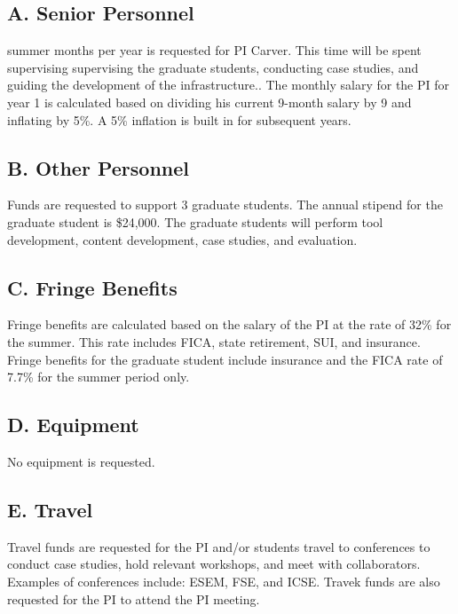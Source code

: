 \subsection*{A. Senior Personnel}
 summer months per year is requested for PI Carver. 
This time will be spent supervising supervising the graduate students, conducting case studies, and guiding the development of the infrastructure..
The monthly salary for the PI for year 1 is calculated based on dividing his current 9-month salary by 9 and inflating by 5\%. 
A 5\% inflation is built in for subsequent years. 
\vspace{8pt}

\subsection*{B. Other Personnel}
\noindent
Funds are requested to support 3 graduate students. 
The annual stipend for the graduate student is \$24,000.
The graduate students will perform tool development, content development, case studies, and evaluation. 
\vspace{8pt}

\subsection*{C. Fringe Benefits}
\noindent
Fringe benefits are calculated based on the salary of the PI at the rate of 32\% for the summer. 
This rate includes FICA, state retirement, SUI, and insurance. 
Fringe benefits for the graduate student include insurance and the FICA rate of 7.7\% for the summer period only. 
\vspace{8pt}

\subsection*{D. Equipment}
\noindent
No equipment is requested.
\vspace{8pt}

\subsection*{E. Travel}
\noindent
Travel funds are requested for the PI and/or students travel to conferences to conduct case studies, hold relevant workshops, and meet with collaborators. 
Examples of conferences include: ESEM, FSE, and ICSE.
Travek funds are also requested for the PI to attend the PI meeting.
\vspace{8pt}

